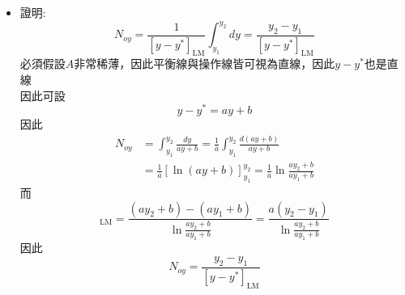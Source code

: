 \documentclass[../main.tex]{subfiles}
\begin{document}
\begin{itemize}
\begin{align}
    N_{ox}  &= \frac{1}{[x^\ast - x]_{\text{LM}}}\int_{x_2}^{x_1} dx = \frac{x_1 - x_2}{[x^\ast - x]_{\text{LM}}}
  \end{align}
  其中那些Log Mean(LM)為:
  \begin{align}
    [y - y_i]_{\text{LM}} &= \frac{(y_2 - y_{2,i}) - (y_1 - y_{1,i})}
      {\ln\frac{y_2 - y_{2,i}}{y_1 - y_{1,i}}} = \frac{y_2 - y_1}{\ln\frac{y_2 - y_{2,i}}{y_1 - y_{1,i}}} \\
    [x_i - x]_{\text{LM}} &= \frac{(x_{2,i} - x_2) - (x_{1,i} - x_1)}
      {\ln\frac{x_{2,i} - x_2}{x_{1,i} - x_1}} = \frac{x_1 - x_2}{\ln\frac{x_{2,i} - x_2}{x_{1,i} - x_1}} \\
    [y - y^\ast]_{\text{LM}} &= \frac{(y_2 - y_2^\ast) - (y_1 - y_1^\ast)}{\ln\frac{y_2 - y_2^\ast}{y_1 - y_1^\ast}} 
      = \frac{y_2 - y_1}{\ln\frac{y_2 - y_2^\ast}{y_1 - y_1^\ast}} \\  
    [x^\ast - x]_{\text{LM}} &= \frac{(x_2^\ast - x_2) - (x_1^\ast - x_1)}{\ln\frac{x_2^\ast - x_2}{x_1^\ast - x_1}} 
      = \frac{x_1 - x_2}{\ln\frac{x_2^\ast - x_2}{x_1^\ast - x_1}}
  \end{align}
  不要管前兩個Local的Log Mean，因為分子中的${y_i},{x_i}$無法直接知道\\
  而後面兩個，$y^\ast,x^\ast$則可以由亨利定律代換:
  \begin{equation}
    y^\ast = H x
  \end{equation}
  因此整個吸收塔在確定了後，就可以計算出$N_{oy}, N_{ox}$，\\
  再由質傳係數與平均流率計算出$H_{oy}, H_{ox}$\\
  然後就可以計算出塔高
  \begin{equation}
    Z = H_{oy}\times N_{oy} \quad \text{或} \quad Z = H_{ox}\times N_{ox}
  \end{equation}
  \item 證明:
  \begin{equation}
    N_{oy}  = \frac{1}{[y - y^\ast]_{\text{LM}}}\int_{y_1}^{y_2} dy = \frac{y_2 - y_1}{[y - y^\ast]_{\text{LM}}}
  \end{equation}
  必須假設$A$非常稀薄，因此平衡線與操作線皆可視為直線，因此$y-y^\ast$也是直線\\
  因此可設
  \begin{equation}
    y - y^\ast = ay +b
  \end{equation}
  因此
  \begin{align}
    N_{oy} &= \int_{y_1}^{y_2} \frac{dy}{ay + b} = \frac{1}{a}\int_{y_1}^{y_2} \frac{d(ay+b)}{ay + b} \\
    &= \frac{1}{a}[\ln(ay+b)]_{y_1}^{y_2} = \frac{1}{a}\ln\frac{ay_2 + b}{ay_1 + b}
  \end{align}
  而
  \begin{equation}
    [y - y^\ast]_{\text{LM}} = \frac{(ay_2 + b) - (ay_1 + b)}{\ln\frac{ay_2 + b}{ay_1 + b}} = \frac{a(y_2 - y_1)}{\ln\frac{ay_2 + b}{ay_1 + b}}
  \end{equation}
  因此
  \begin{equation}
    N_{oy} = \frac{y_2 - y_1}{[y - y^\ast]_{\text{LM}}}
  \end{equation}
\end{itemize}
\end{document}
